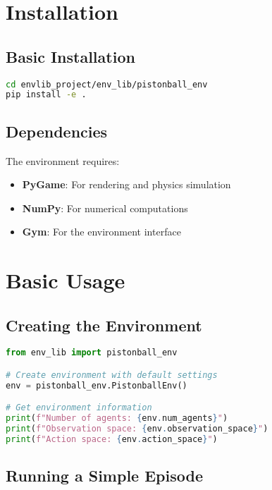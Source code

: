 \section{Installation}

\subsection{Basic Installation}

\begin{lstlisting}[language=bash, caption=Basic Installation]
cd envlib_project/env_lib/pistonball_env
pip install -e .
\end{lstlisting}

\subsection{Dependencies}

The environment requires:
\begin{itemize}
    \item \textbf{PyGame}: For rendering and physics simulation
    \item \textbf{NumPy}: For numerical computations
    \item \textbf{Gym}: For the environment interface
\end{itemize}

\section{Basic Usage}

\subsection{Creating the Environment}

\begin{lstlisting}[language=python, caption=Basic Environment Creation]
from env_lib import pistonball_env

# Create environment with default settings
env = pistonball_env.PistonballEnv()

# Get environment information
print(f"Number of agents: {env.num_agents}")
print(f"Observation space: {env.observation_space}")
print(f"Action space: {env.action_space}")
\end{lstlisting}

\subsection{Running a Simple Episode}

